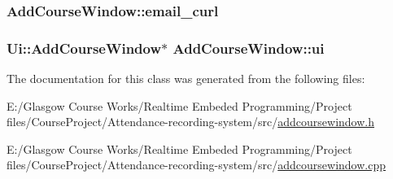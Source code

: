 \subsubsection[{email\+\_\+curl}]{ Add\+Course\+Window\+::email\+\_\+curl\hspace{0.3cm}{\ttfamily [private]}}\label{class_add_course_window_aab5c3d1924483c1e11bcaa5afe3b6e03}
\hypertarget{class_add_course_window_a502080104692859b537c0a3e7667956e}{}
\subsubsection[{ui}]{\setlength{\rightskip}{0pt plus 5cm}Ui\+::\+Add\+Course\+Window$\ast$ Add\+Course\+Window\+::ui\hspace{0.3cm}{\ttfamily [private]}}\label{class_add_course_window_a502080104692859b537c0a3e7667956e}


The documentation for this class was generated from the following files\+:\begin{DoxyCompactItemize}
\item 
E\+:/\+Glasgow Course Works/\+Realtime Embeded Programming/\+Project files/\+Course\+Project/\+Attendance-\/recording-\/system/src/\hyperlink{addcoursewindow_8h}{addcoursewindow.\+h}\item 
E\+:/\+Glasgow Course Works/\+Realtime Embeded Programming/\+Project files/\+Course\+Project/\+Attendance-\/recording-\/system/src/\hyperlink{addcoursewindow_8cpp}{addcoursewindow.\+cpp}\end{DoxyCompactItemize}
